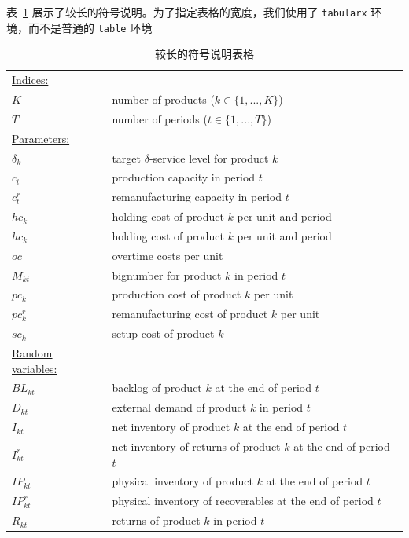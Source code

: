 \documentclass[zihao = -4, linespread = 1.5]{ctexart}
\begin{document}
表~\ref{tab:notationlong} 展示了较长的符号说明。为了指定表格的宽度，我们使用了 \texttt{tabularx} 环境，而不是普通的 \texttt{table} 环境
\begin{table}[htbp]
    \caption{较长的符号说明表格}\label{tab:notationlong}
    \begin{tabularx}{\textwidth}{p{}X}
    \toprule
      \underline{Indices: } \\
      $K$ & number of products ($k \in\{1,...,K\}$)  \\
      $T$ & number of periods ($t \in\{1,...,T\}$)\\

      \underline{Parameters: } \\
      $\delta_k$ & target $\delta$-service level for product $k$ \\
      $c_t$      & production capacity in period $t$ \\
      $c^r_t$    & remanufacturing capacity in period $t$  \\
      $hc_k$    & holding cost of product $k$ per unit and period   \\
      $hc_k$     & holding cost of product $k$ per unit and period   \\
      $oc$   & overtime costs per unit   \\
      $M_{kt}$   & bignumber for product $k$ in period $t$\\
      $pc_{k}$   & production cost of product $k$ per unit\\
      $pc^r_{k}$ & remanufacturing cost of product $k$ per unit\\
      $sc_{k}$   &  setup cost of product $k$\\
      \underline{Random variables: } \\
      $BL_{kt}$  & backlog of product $k$ at the end of period $t$\\
      $D_{kt}$   & external demand of product $k$ in period $t$  \\
      $I_{kt}$   & net inventory of product $k$ at the end of period $t$  \\
      $I^r_{kt}$ & net inventory of returns of product $k$ at the end of period $t$  \\
      $IP_{kt}$   & physical inventory of product $k$ at the end of period $t$\\
      $IP^r_{kt}$   & physical inventory of recoverables at the end of period $t$\\
      $R_{kt}$   &  returns of product $k$ in period $t$\\

\end{tabularx}
\end{table}
\end{document}
